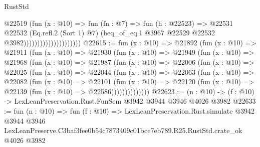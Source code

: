 \begin{lexlean}{RustStd}
\begin{coremodule}
                                        @22519
                                          (fun (x : @10) =>
                                          fun (fn : @7) =>
                                          fun (h : @22523) =>
                                          @22531
                                            @22532
                                            (Eq.refl.{2} (Sort 1) @7)
                                            (heq_of_eq.{1}
                                              @3967
                                              @22529
                                              @22532
                                              @3982)))))))))))))))))))))
@22615 := fun (x : @10) =>
  @21892
    (fun (x : @10) =>
    @21911
      (fun (x : @10) =>
      @21930
        (fun (x : @10) =>
        @21949
          (fun (x : @10) =>
          @21968
            (fun (x : @10) =>
            @21987
              (fun (x : @10) =>
              @22006
                (fun (x : @10) =>
                @22025
                  (fun (x : @10) =>
                  @22044
                    (fun (x : @10) =>
                    @22063
                      (fun (x : @10) =>
                      @22082
                        (fun (x : @10) =>
                        @22101
                          (fun (x : @10) =>
                          @22120 (fun (x : @10) => @22139 (fun (x : @10) => @22586))))))))))))))
@22623 := (n : @10) -> (f : @10) -> LexLeanPreservation.Rust.FunSem @3942 @3944 @3946 @4026 @3982
@22633 := fun (n : @10) =>
  fun (f : @10) =>
  LexLeanPreservation.Rust.simulate
    @3942
    @3944
    @3946
    LexLeanPreserve.C3baf3fee0b54c7873409c01bce7eb789.R25.RustStd.crate_ok
    @4026
    @3982
\end{coremodule}
\end{lexlean}
